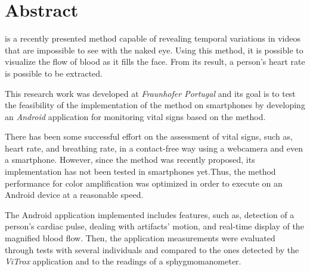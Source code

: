 \chapter*{Abstract}

\evm{} is a recently presented method capable of revealing temporal
variations in videos that are impossible to see with the naked eye.
Using this method, it is possible to visualize the flow of blood as
it fills the face. From its result, a person's heart rate is possible
to be extracted.

This research work was developed at \emph{Fraunhofer Portugal}
and its goal is to test the feasibility of the
implementation of the \evm{} method on smartphones by developing
an \emph{Android} application for monitoring vital signs based on
the \evm{} method.

There has been some successful effort on the assessment of vital
signs, such as, heart rate, and breathing rate, in a contact-free
way using a webcamera and even a smartphone. However, since the
\evm{} method was recently proposed, its implementation has not
been tested in smartphones yet.Thus, the \evm{} method performance
for color amplification was optimized in order to execute on an Android
device at a reasonable speed.

The Android application implemented includes features, such as,
detection of a person's cardiac pulse, dealing with artifacts' motion,
and real-time display of the magnified blood flow.
Then, the application measurements were evaluated through tests
with several individuals and compared to the ones detected by
the \emph{ViTrox} application and to the readings of a sphygmomanometer.







